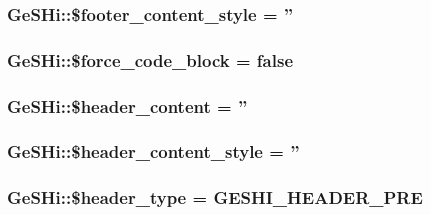 \hypertarget{class_ge_s_hi_a55f7570d0967eecf9a18e39cf8d981e0}{
\subsubsection[{\$footer\-\_\-content\-\_\-style}]{\setlength{\rightskip}{0pt plus 5cm}Ge\-S\-Hi\-::\$footer\-\_\-content\-\_\-style = ''}}\label{class_ge_s_hi_a55f7570d0967eecf9a18e39cf8d981e0}
\hypertarget{class_ge_s_hi_a143657164b0bd42bce03ee7f31206538}{
\subsubsection[{\$force\-\_\-code\-\_\-block}]{\setlength{\rightskip}{0pt plus 5cm}Ge\-S\-Hi\-::\$force\-\_\-code\-\_\-block = false}}\label{class_ge_s_hi_a143657164b0bd42bce03ee7f31206538}
\hypertarget{class_ge_s_hi_a1b834089672ac67c4fbcbc48c81b6f50}{
\subsubsection[{\$header\-\_\-content}]{\setlength{\rightskip}{0pt plus 5cm}Ge\-S\-Hi\-::\$header\-\_\-content = ''}}\label{class_ge_s_hi_a1b834089672ac67c4fbcbc48c81b6f50}
\hypertarget{class_ge_s_hi_a5c7606fbd67561a99d818e63de50f8a9}{
\subsubsection[{\$header\-\_\-content\-\_\-style}]{\setlength{\rightskip}{0pt plus 5cm}Ge\-S\-Hi\-::\$header\-\_\-content\-\_\-style = ''}}\label{class_ge_s_hi_a5c7606fbd67561a99d818e63de50f8a9}
\hypertarget{class_ge_s_hi_a900819acce647d850e406bd86f81ca8f}{
\subsubsection[{\$header\-\_\-type}]{\setlength{\rightskip}{0pt plus 5cm}Ge\-S\-Hi\-::\$header\-\_\-type = {\bf G\-E\-S\-H\-I\-\_\-\-H\-E\-A\-D\-E\-R\-\_\-\-P\-R\-E}}}\label{class_ge_s_hi_a900819acce647d850e406bd86f81ca8f}
